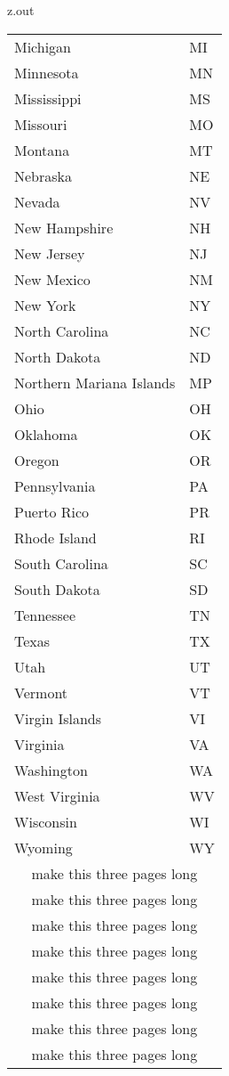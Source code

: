 \begin{VerbatimOut}{z.out}
\begin{longtable}{@{}ll@{}}
  Michigan& MI\\
  Minnesota& MN\\
  Mississippi& MS\\
  Missouri& MO\\
  Montana& MT\\
  Nebraska& NE\\
  Nevada& NV\\
  New Hampshire& NH\\
  New Jersey& NJ\\
  New Mexico& NM\\
  New York& NY\\
  North Carolina& NC\\
  North Dakota& ND\\
  Northern Mariana Islands& MP\\
  Ohio& OH\\
  Oklahoma& OK\\
  Oregon& OR\\
  Pennsylvania& PA\\
  Puerto Rico& PR\\
  Rhode Island& RI\\
  South Carolina& SC\\
  South Dakota& SD\\
  Tennessee& TN\\
  Texas& TX\\
  Utah& UT\\
  Vermont& VT\\
  Virgin Islands& VI\\
  Virginia& VA\\
  Washington& WA\\
  West Virginia& WV\\
  Wisconsin& WI\\
  Wyoming& WY\\
  \multicolumn{2}{c}{make this three pages long}\\
  \multicolumn{2}{c}{make this three pages long}\\
  \multicolumn{2}{c}{make this three pages long}\\
  \multicolumn{2}{c}{make this three pages long}\\
  \multicolumn{2}{c}{make this three pages long}\\
  \multicolumn{2}{c}{make this three pages long}\\
  \multicolumn{2}{c}{make this three pages long}\\
  \multicolumn{2}{c}{make this three pages long}\\

\end{longtable}
\end{VerbatimOut}
